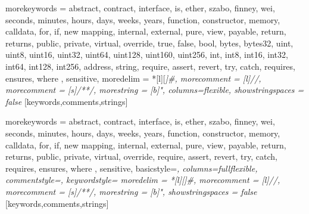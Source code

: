 



\newcommand{\commentstyle}[1]{\color{ccomment}\itshape{#1}}
\newcommand{\keywordstyle}[1]{\color{ckeyword}\bfseries{#1}}
\newcommand{\stringstyle}[1]{\color{cstring}\text{#1}}

%
{morekeywords = {
  abstract, contract, interface, is,
  ether, szabo, finney, wei,
  seconds, minutes, hours, days, weeks, years,
  function, constructor, memory, calldata,
  for, if, new
  mapping,
  internal, external, pure, view, payable, return, returns,
  public, private, virtual, override,
  true, false, bool,
  bytes, bytes32,
  uint, uint8, uint16, uint32, uint64, uint128, uint160, uint256,
  int, int8, int16, int32, int64, int128, int256,
  address, string,
  require, assert, revert, try, catch,
  requires, ensures, where
  },%
  sensitive,%
  moredelim = *[l][\itshape]{\#},
  morecomment = [l]//,%
  morecomment = [s]{/*}{*/},%
  morestring = [b]",%
  columns=flexible,
  showstringspaces = false%
}[keywords,comments,strings]%

\newcommand{\speckeywordstyle}[1]{\color{csspec}{\bfseries{#1}}}

%
{morekeywords = {
  abstract, contract, interface, is,
  ether, szabo, finney, wei,
  seconds, minutes, hours, days, weeks, years,
  function, constructor, memory, calldata,
  for, if, new
  mapping,
  internal, external, pure, view, payable, return, returns,
  public, private, virtual, override,
  require, assert, revert, try, catch,
  requires, ensures, where
  },%
  sensitive,%
  basicstyle=\itshape\small\color{csspec},
  columns=fullflexible,
  commentstyle=\commentstyle,
  keywordstyle=\speckeywordstyle,
  moredelim = *[l][\itshape]{\#},
  morecomment = [l]//,%
  morecomment = [s]{/*}{*/},%
  morestring = [b]",%
  showstringspaces = false%
}[keywords,comments,strings]%

